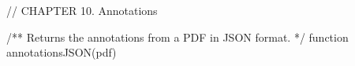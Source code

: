 // CHAPTER 10. Annotations 

/** Returns the annotations from a PDF in JSON format. */
function annotationsJSON(pdf)
